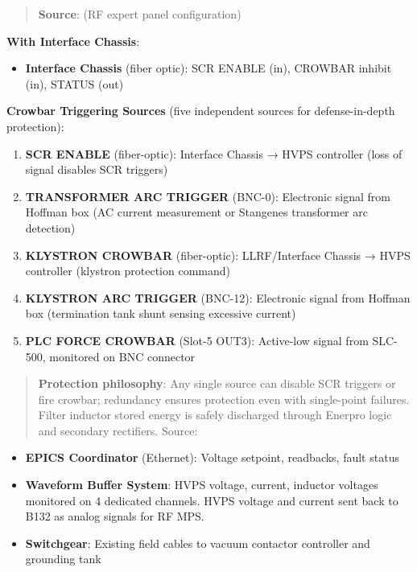 \begin{quote}
\textbf{Source}:  (RF expert panel configuration)
\end{quote}

\textbf{With Interface Chassis}:

\begin{itemize}
\tightlist
\item
  \textbf{Interface Chassis} (fiber optic): SCR ENABLE (in), CROWBAR inhibit (in), STATUS (out)
\end{itemize}

\textbf{Crowbar Triggering Sources} (five independent sources for defense-in-depth protection):

\begin{enumerate}
\def\labelenumi{\arabic{enumi}.}
\tightlist
\item
  \textbf{SCR ENABLE} (fiber-optic): Interface Chassis → HVPS controller (loss of signal disables SCR triggers)
\item
  \textbf{TRANSFORMER ARC TRIGGER} (BNC-0): Electronic signal from Hoffman box (AC current measurement or Stangenes transformer arc detection)
\item
  \textbf{KLYSTRON CROWBAR} (fiber-optic): LLRF/Interface Chassis → HVPS controller (klystron protection command)
\item
  \textbf{KLYSTRON ARC TRIGGER} (BNC-12): Electronic signal from Hoffman box (termination tank shunt sensing excessive current)
\item
  \textbf{PLC FORCE CROWBAR} (Slot-5 OUT3): Active-low signal from SLC-500, monitored on BNC connector
\end{enumerate}

\begin{quote}
\textbf{Protection philosophy}: Any single source can disable SCR triggers or fire crowbar; redundancy ensures protection even with single-point failures. Filter inductor stored energy is safely discharged through Enerpro logic and secondary rectifiers. Source: 
\end{quote}

\begin{itemize}
\tightlist
\item
  \textbf{EPICS Coordinator} (Ethernet): Voltage setpoint, readbacks, fault status
\item
  \textbf{Waveform Buffer System}: HVPS voltage, current, inductor voltages monitored on 4 dedicated channels. HVPS voltage and current sent back to B132 as analog signals for RF MPS.
\item
  \textbf{Switchgear}: Existing field cables to vacuum contactor controller and grounding tank
\end{itemize}


